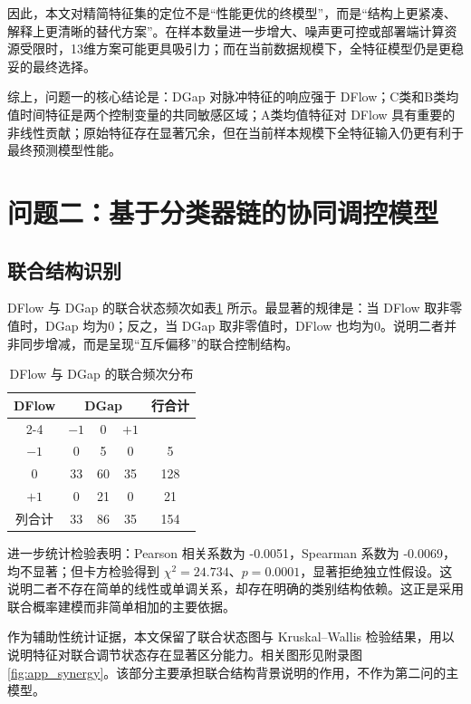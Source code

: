 \documentclass[UTF8,a4paper,12pt]{ctexart}
\begin{document}
因此，本文对精简特征集的定位不是“性能更优的终模型”，而是“结构上更紧凑、解释上更清晰的替代方案”。在样本数量进一步增大、噪声更可控或部署端计算资源受限时，13维方案可能更具吸引力；而在当前数据规模下，全特征模型仍是更稳妥的最终选择。

综上，问题一的核心结论是：DGap 对脉冲特征的响应强于 DFlow；C类和B类均值时间特征是两个控制变量的共同敏感区域；A类均值特征对 DFlow 具有重要的非线性贡献；原始特征存在显著冗余，但在当前样本规模下全特征输入仍更有利于最终预测模型性能。

\section{问题二：基于分类器链的协同调控模型}

\subsection{联合结构识别}

DFlow 与 DGap 的联合状态频次如表\ref{tab:joint} 所示。最显著的规律是：当 DFlow 取非零值时，DGap 均为0；反之，当 DGap 取非零值时，DFlow 也均为0。说明二者并非同步增减，而是呈现“互斥偏移”的联合控制结构。

\begin{table}[H]
\centering
\caption{DFlow 与 DGap 的联合频次分布}
\label{tab:joint}
\begin{tabular}{c|ccc|c}
\toprule
\multirow{2}{*}{DFlow} & \multicolumn{3}{c|}{DGap} & \multirow{2}{*}{行合计} \\
\cmidrule(lr){2-4}
& $-1$ & $0$ & $+1$ & \\
\midrule
$-1$ & 0 & 5 & 0 & 5 \\
$0$  & 33 & 60 & 35 & 128 \\
$+1$ & 0 & 21 & 0 & 21 \\
\midrule
列合计 & 33 & 86 & 35 & 154 \\
\bottomrule
\end{tabular}
\end{table}

进一步统计检验表明：Pearson 相关系数为 -0.0051，Spearman 系数为 -0.0069，均不显著；但卡方检验得到 $\chi^2=24.734$、$p=0.0001$，显著拒绝独立性假设。这说明二者不存在简单的线性或单调关系，却存在明确的类别结构依赖。这正是采用联合概率建模而非简单相加的主要依据。

作为辅助性统计证据，本文保留了联合状态图与 Kruskal--Wallis 检验结果，用以说明特征对联合调节状态存在显著区分能力。相关图形见附录图\ref{fig:app_synergy}。该部分主要承担联合结构背景说明的作用，不作为第二问的主模型。
\end{document}
